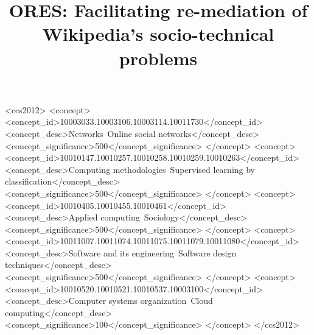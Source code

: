 \documentclass[format=acmsmall, review=false, screen=true]{acmart}
\begin{document}
\title[ORES]{ORES: Facilitating re-mediation of Wikipedia's socio-technical problems}




\begin{abstract}

\end{abstract}


%
%
\begin{CCSXML}
<ccs2012>
<concept>
<concept_id>10003033.10003106.10003114.10011730</concept_id>
<concept_desc>Networks~Online social networks</concept_desc>
<concept_significance>500</concept_significance>
</concept>
<concept>
<concept_id>10010147.10010257.10010258.10010259.10010263</concept_id>
<concept_desc>Computing methodologies~Supervised learning by classification</concept_desc>
<concept_significance>500</concept_significance>
</concept>
<concept>
<concept_id>10010405.10010455.10010461</concept_id>
<concept_desc>Applied computing~Sociology</concept_desc>
<concept_significance>500</concept_significance>
</concept>
<concept>
<concept_id>10011007.10011074.10011075.10011079.10011080</concept_id>
<concept_desc>Software and its engineering~Software design techniques</concept_desc>
<concept_significance>500</concept_significance>
</concept>
<concept>
<concept_id>10010520.10010521.10010537.10003100</concept_id>
<concept_desc>Computer systems organization~Cloud computing</concept_desc>
<concept_significance>100</concept_significance>
</concept>
</ccs2012>
\end{CCSXML}



%
%



\maketitle


\end{document}
